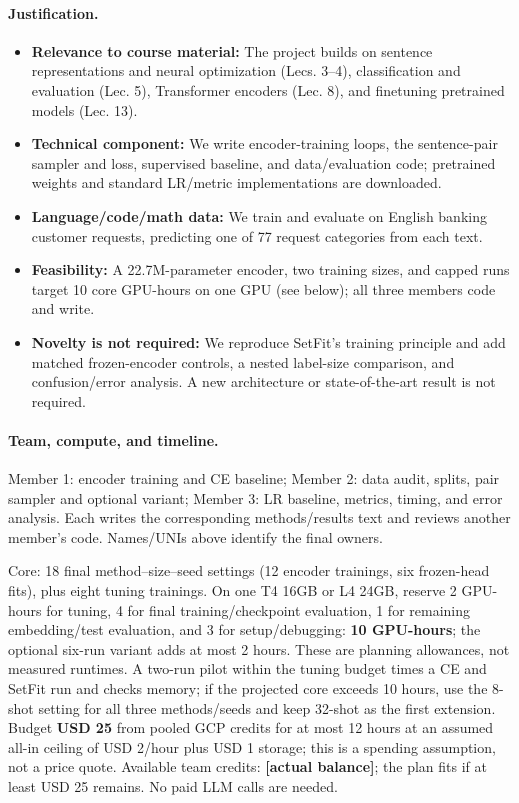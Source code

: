 \documentclass{article}
\begin{document}
\paragraph{Justification.}
\begin{itemize}
\item \textbf{Relevance to course material:} The project builds on sentence representations and neural optimization (Lecs. 3--4), classification and evaluation (Lec. 5), Transformer encoders (Lec. 8), and finetuning pretrained models (Lec. 13).
\item \textbf{Technical component:} We write encoder-training loops, the sentence-pair sampler and loss, supervised baseline, and data/evaluation code; pretrained weights and standard LR/metric implementations are downloaded.
\item \textbf{Language/code/math data:} We train and evaluate on English banking customer requests, predicting one of 77 request categories from each text.
\item \textbf{Feasibility:} A 22.7M-parameter encoder, two training sizes, and capped runs target 10 core GPU-hours on one GPU (see below); all three members code and write.
\item \textbf{Novelty is not required:} We reproduce SetFit's training principle and add matched frozen-encoder controls, a nested label-size comparison, and confusion/error analysis. A new architecture or state-of-the-art result is not required.
\end{itemize}

\paragraph{Team, compute, and timeline.}
Member 1: encoder training and CE baseline; Member 2: data audit, splits, pair sampler and optional variant; Member 3: LR baseline, metrics, timing, and error analysis. Each writes the corresponding methods/results text and reviews another member's code. Names/UNIs above identify the final owners.

Core: 18 final method--size--seed settings (12 encoder trainings, six frozen-head fits), plus eight tuning trainings. On one T4 16GB or L4 24GB, reserve 2 GPU-hours for tuning, 4 for final training/checkpoint evaluation, 1 for remaining embedding/test evaluation, and 3 for setup/debugging: \textbf{10 GPU-hours}; the optional six-run variant adds at most 2 hours. These are planning allowances, not measured runtimes. A two-run pilot within the tuning budget times a CE and SetFit run and checks memory; if the projected core exceeds 10 hours, use the 8-shot setting for all three methods/seeds and keep 32-shot as the first extension. Budget \textbf{USD 25} from pooled GCP credits for at most 12 hours at an assumed all-in ceiling of USD 2/hour plus USD 1 storage; this is a spending assumption, not a price quote. Available team credits: \textbf{[actual balance]}; the plan fits if at least USD 25 remains. No paid LLM calls are needed.
\end{document}
